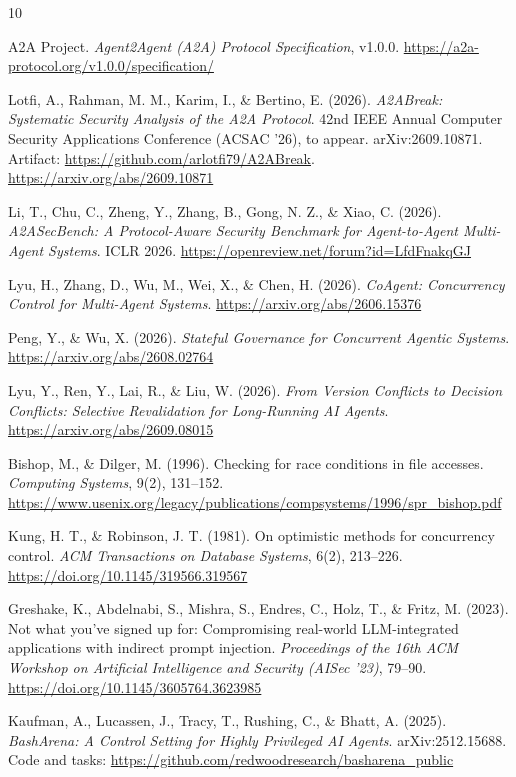 \documentclass[11pt]{article}
\begin{document}
\begin{thebibliography}{10}

A2A Project. \emph{Agent2Agent (A2A) Protocol Specification}, v1.0.0.
\url{https://a2a-protocol.org/v1.0.0/specification/}

Lotfi, A., Rahman, M. M., Karim, I., \& Bertino, E. (2026). \emph{A2ABreak: Systematic Security Analysis of the A2A Protocol}. 42nd IEEE Annual Computer Security Applications Conference (ACSAC '26), to appear. arXiv:2609.10871. Artifact: \url{https://github.com/arlotfi79/A2ABreak}.
\url{https://arxiv.org/abs/2609.10871}

Li, T., Chu, C., Zheng, Y., Zhang, B., Gong, N. Z., \& Xiao, C. (2026). \emph{A2ASecBench: A Protocol-Aware Security Benchmark for Agent-to-Agent Multi-Agent Systems}. ICLR 2026.
\url{https://openreview.net/forum?id=LfdFnakqGJ}

Lyu, H., Zhang, D., Wu, M., Wei, X., \& Chen, H. (2026). \emph{CoAgent: Concurrency Control for Multi-Agent Systems}.
\url{https://arxiv.org/abs/2606.15376}

Peng, Y., \& Wu, X. (2026). \emph{Stateful Governance for Concurrent Agentic Systems}.
\url{https://arxiv.org/abs/2608.02764}

Lyu, Y., Ren, Y., Lai, R., \& Liu, W. (2026). \emph{From Version Conflicts to Decision Conflicts: Selective Revalidation for Long-Running AI Agents}.
\url{https://arxiv.org/abs/2609.08015}

Bishop, M., \& Dilger, M. (1996). Checking for race conditions in file accesses. \emph{Computing Systems}, 9(2), 131--152.
\url{https://www.usenix.org/legacy/publications/compsystems/1996/spr_bishop.pdf}

Kung, H. T., \& Robinson, J. T. (1981). On optimistic methods for concurrency control. \emph{ACM Transactions on Database Systems}, 6(2), 213--226.
\url{https://doi.org/10.1145/319566.319567}

Greshake, K., Abdelnabi, S., Mishra, S., Endres, C., Holz, T., \& Fritz, M. (2023). Not what you've signed up for: Compromising real-world LLM-integrated applications with indirect prompt injection. \emph{Proceedings of the 16th ACM Workshop on Artificial Intelligence and Security (AISec '23)}, 79--90.
\url{https://doi.org/10.1145/3605764.3623985}

Kaufman, A., Lucassen, J., Tracy, T., Rushing, C., \& Bhatt, A. (2025). \emph{BashArena: A Control Setting for Highly Privileged AI Agents}. arXiv:2512.15688. Code and tasks: \url{https://github.com/redwoodresearch/basharena_public}

\end{thebibliography}
\end{document}
